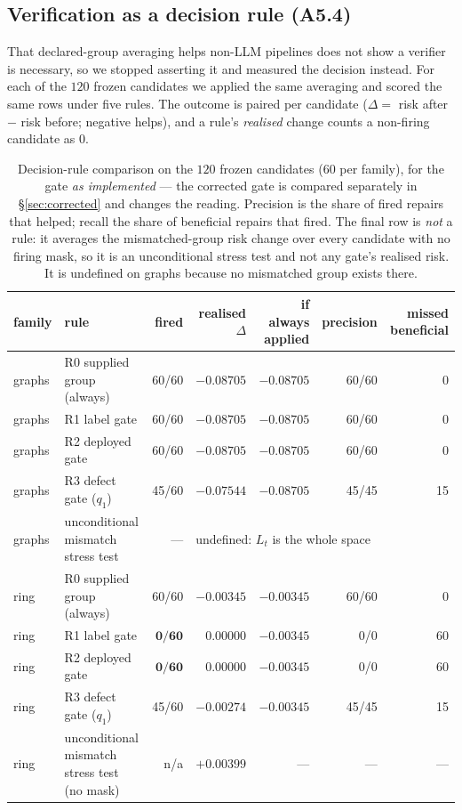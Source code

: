 \documentclass[11pt]{article}
\begin{document}
\subsection{Verification as a decision rule (A5.4)}
\label{sec:decision}

That declared-group averaging helps non-LLM pipelines does not show a verifier is necessary,
so we stopped asserting it and measured the decision instead. For each of the $120$ frozen
candidates we applied the same averaging and scored the same rows under five rules. The
outcome is paired per candidate ($\Delta = $ risk after $-$ risk before; negative helps), and
a rule's \emph{realised} change counts a non-firing candidate as $0$.

\begin{table}[t]
\centering
\caption{Decision-rule comparison on the $120$ frozen candidates ($60$ per family), for the
gate \emph{as implemented} --- the corrected gate is compared separately in
\S\ref{sec:corrected} and changes the reading. Precision is the share of fired repairs that
helped; recall the share of beneficial repairs that fired. The final row is \emph{not} a rule:
it averages the mismatched-group risk change over every candidate with no firing mask, so it
is an unconditional stress test and not any gate's realised risk. It is undefined on graphs
because no mismatched group exists there.}
\label{tab:decision}
\small
\begin{tabular}{llrrrrr}
\toprule
family & rule & fired & realised $\Delta$ & if always applied & precision & missed beneficial \\
\midrule
graphs & R0 supplied group (always) & 60/60 & $-0.08705$ & $-0.08705$ & 60/60 & 0 \\
graphs & R1 label gate & 60/60 & $-0.08705$ & $-0.08705$ & 60/60 & 0 \\
graphs & R2 deployed gate & 60/60 & $-0.08705$ & $-0.08705$ & 60/60 & 0 \\
graphs & R3 defect gate ($q_1$) & 45/60 & $-0.07544$ & $-0.08705$ & 45/45 & 15 \\
graphs & unconditional mismatch stress test & --- & \multicolumn{4}{l}{undefined: $L_t$ is the whole space} \\
\midrule
ring & R0 supplied group (always) & 60/60 & $-0.00345$ & $-0.00345$ & 60/60 & 0 \\
ring & R1 label gate & $\mathbf{0/60}$ & $\mathbf{0.00000}$ & $-0.00345$ & 0/0 & 60 \\
ring & R2 deployed gate & $\mathbf{0/60}$ & $\mathbf{0.00000}$ & $-0.00345$ & 0/0 & 60 \\
ring & R3 defect gate ($q_1$) & 45/60 & $-0.00274$ & $-0.00345$ & 45/45 & 15 \\
ring & unconditional mismatch stress test (no mask) & n/a & $+0.00399$ & --- & --- & --- \\
\bottomrule
\end{tabular}
\end{table}
\end{document}
